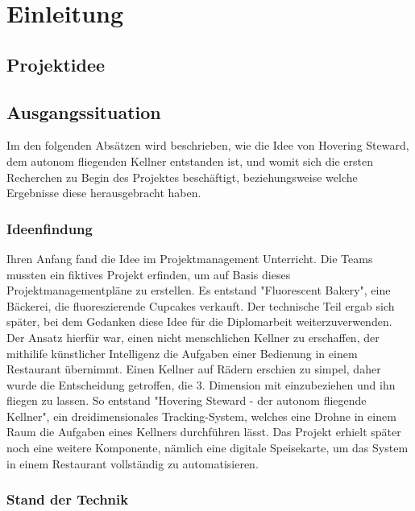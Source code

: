 \chapter{Einleitung}
\renewcommand{\kapitelautor}{Autor: Markus Kaiser}

\section{Projektidee}

\section{Ausgangssituation}
  Im den folgenden Absätzen wird beschrieben, wie die Idee von Hovering Steward, dem autonom fliegenden Kellner
  entstanden ist, und womit sich die ersten Recherchen zu Begin des Projektes beschäftigt, beziehungsweise
  welche Ergebnisse diese herausgebracht haben.

  \subsection{Ideenfindung}
  Ihren Anfang fand die Idee im Projektmanagement Unterricht. Die Teams mussten ein fiktives Projekt erfinden, um auf Basis dieses
  Projektmanagementpläne zu erstellen. Es entstand "Fluorescent Bakery", eine Bäckerei, die fluoreszierende Cupcakes verkauft.
  Der technische Teil ergab sich später, bei dem Gedanken diese Idee für die Diplomarbeit weiterzuverwenden. Der Ansatz hierfür war,
  einen nicht menschlichen Kellner zu erschaffen, der mithilife künstlicher Intelligenz die Aufgaben einer Bedienung in einem Restaurant übernimmt.
  Einen Kellner auf Rädern erschien zu simpel, daher wurde die Entscheidung getroffen, die 3. Dimension mit einzubeziehen und ihn fliegen zu lassen.
  So entstand "Hovering Steward - der autonom fliegende Kellner", ein dreidimensionales Tracking-System, welches eine Drohne in einem Raum die Aufgaben eines Kellners durchführen lässt.
  Das Projekt erhielt später noch eine weitere Komponente, nämlich eine digitale Speisekarte, um das System in einem Restaurant vollständig zu automatisieren.

  \subsection{Stand der Technik}

